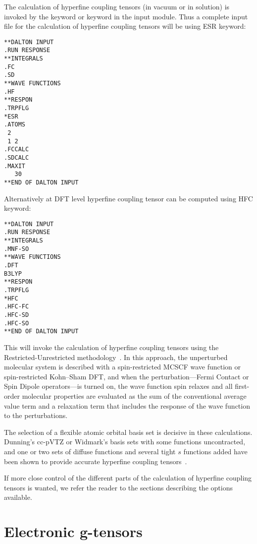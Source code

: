     The calculation of hyperfine coupling tensors (in vacuum or in
solution) is invoked by the keyword  or keyword  in the 
input module. Thus a complete input file for the calculation of
hyperfine coupling tensors will be using ESR keyword:

\begin{verbatim}
**DALTON INPUT
.RUN RESPONSE
**INTEGRALS
.FC
.SD
**WAVE FUNCTIONS
.HF
**RESPON
.TRPFLG
*ESR
.ATOMS
 2
 1 2
.FCCALC
.SDCALC
.MAXIT
   30
**END OF DALTON INPUT
\end{verbatim}

    Alternatively at DFT level hyperfine coupling tensor can be computed using HFC keyword:

 \begin{verbatim}
**DALTON INPUT
.RUN RESPONSE
**INTEGRALS
.MNF-SO
**WAVE FUNCTIONS
.DFT
B3LYP
**RESPON
.TRPFLG
*HFC
.HFC-FC
.HFC-SD 
.HFC-SO
**END OF DALTON INPUT
\end{verbatim}
    
    This will invoke the calculation of hyperfine
coupling tensors
using the Restricted-Unrestricted
methodology~\cite{bfpjjbjothhjajjcp97}. In this approach, the
unperturbed molecular system is described with a spin-restricted MCSCF
wave function or spin-restricted Kohn--Sham DFT, and when the perturbation---Fermi Contact or Spin Dipole
operators---is turned on, the wave function spin relaxes and all
first-order molecular properties are evaluated as the sum of the
conventional average value term and a relaxation term that includes
the response of the wave function to the perturbations.

    The selection of a flexible atomic orbital basis set is decisive
in these calculations. Dunning's cc-pVTZ or Widmark's basis sets with some
functions uncontracted, and one or two sets of diffuse functions and
several tight $s$ functions added have been shown to provide accurate
hyperfine coupling tensors~\cite{bfpjcpl232}.

    If more close control of the different parts of the calculation
of hyperfine coupling tensors is wanted, we refer the reader to the
sections describing the options available.

\section{Electronic g-tensors}

